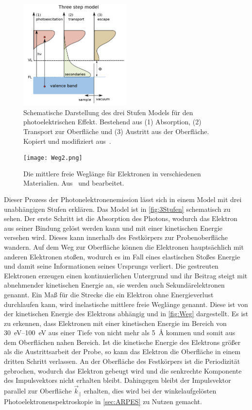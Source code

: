         \begin{figure}
            \centering
            \includegraphics[width=0.5\textwidth]{3Stufen}
            \caption{Schematische Darstellung des drei Stufen Models für den photoelektrischen Effekt.
            Bestehend aus (1) Absorption, (2) Transport zur Oberfläche und (3) Austritt aus der Oberfläche.
            Kopiert und modifiziert aus~\cite{zhang_synchrotron_2018}.}
            \label{fig:3Stufen}
        \end{figure}
        \begin{figure}
            \centering
            \texttt{[image: Weg2.png]}
            \caption{Die mittlere freie Weglänge für Elektronen in verschiedenen Materialien. Aus~\cite{Hüfner} und bearbeitet.}
            \label{fig:Weg}
        \end{figure}
        Dieser Prozess der Photonelektronenemission lässt sich in einem Model mit drei unabhängigen Stufen erklären.
        Das Model ist in \autoref{fig:3Stufen} schematisch zu sehen.
        Der erste Schritt ist die Absorption des Photons, wodurch das Elektron aus seiner Bindung gelöst werden kann und mit einer kinetischen Energie versehen wird.
        Dieses kann innerhalb des Festkörpers zur Probenoberfläche wandern.
        Auf dem Weg zur Oberfläche können die  Elektronen hauptsächlich mit anderen Elektronen stoßen, wodurch es im Fall eines elastischen Stoßes Energie und damit seine Informationen seines Ursprungs verliert.
        Die gestreuten Elektronen erzeugen einen kontinuierlichen Untergrund und ihr Beitrag steigt mit abnehmender kinetischen Energie an, sie werden auch Sekundärelektronen genannt.
        Ein Maß für die Strecke die ein Elektron ohne Energieverlust durchlaufen kann, wird inelastische mittlere freie Weglänge genannt.
        Diese ist von der kinetischen Energie des Elektrons abhängig und in \autoref{fig:Weg} dargestellt.
        Es ist zu erkennen, dass Elektronen mit einer kinetischen Energie im Bereich von \SIrange{30}{100}{\electronvolt} aus einer Tiefe von nicht mehr als \SI{5}{\angstrom} kommen und somit aus dem Oberflächen nahen Bereich.
        Ist die kinetische Energie des Elektrons größer als die Austrittsarbeit der Probe, so kann das Elektron die Oberfläche in einem dritten Schritt verlassen.
        An der Oberfläche des Festkörpers ist die Periodizität gebrochen, wodurch das Elektron gebeugt wird und die senkrechte Komponente des Impulsvektors nicht erhalten bleibt.
        Dahingegen bleibt der Impulsvektor parallel zur Oberfläche $\vec{k}_{||}$ erhalten, dies wird bei der winkelaufgelösten Photoelektronenspektroskopie in \autoref{sec:ARPES} zu Nutzen gemacht.

